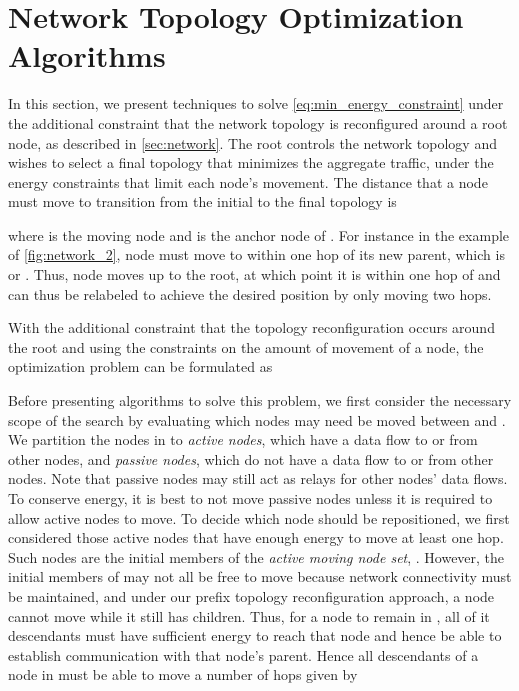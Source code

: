 \documentclass[10pt,conference]{IEEEtran}
\begin{document}
\section{Network Topology Optimization Algorithms}
\label{sec:opt}

In this section, we present techniques to solve
\eqref{eq:min_energy_constraint} under the additional constraint that
the network topology is reconfigured around a root node, as described
in \autoref{sec:network}.  The root controls the network topology and
wishes to select a final topology that minimizes the aggregate
traffic, under the energy constraints that limit each node's movement.
The distance that a node must move to transition from the initial to
the final topology is

where  is the moving node and  is the anchor node of .
For instance in the example of \autoref{fig:network_2}, node  must move
to within one hop of its new parent, which is  or .  Thus, node
 moves up to the root, at which point it is within one hop of 
and can thus be relabeled  to achieve the desired position by only
moving two hops.

With the additional constraint that the topology reconfiguration occurs
around the root and using the constraints on the amount of movement of
a node, the optimization problem can be formulated as


Before presenting algorithms to solve this problem, we first consider
the necessary scope of the search by evaluating which nodes may need
be moved between  and .  We partition
the nodes in to {\it active nodes}, which have a data flow to or from
other nodes, and {\it passive nodes}, which do not have a data flow to
or from other nodes.  Note that passive nodes may still act as relays
for other nodes' data flows.  To conserve energy, it is best to not
move passive nodes unless it is required to allow active nodes to
move.  To decide which node should be repositioned, we first
considered those active nodes that have enough energy to move at least
one hop.  Such nodes are the initial members of the {\it active moving
  node set}, .  However, the initial members of
 may not all be free to move because network
connectivity must be maintained, and under our prefix topology
reconfiguration approach, a node cannot move while it still has
children.
Thus, for a node to remain in , all of it
descendants must have sufficient energy to reach that node and hence
be able to establish communication with that node's parent.
Hence all descendants of a node in  must be able to
move a number of hops given by
\end{document}
